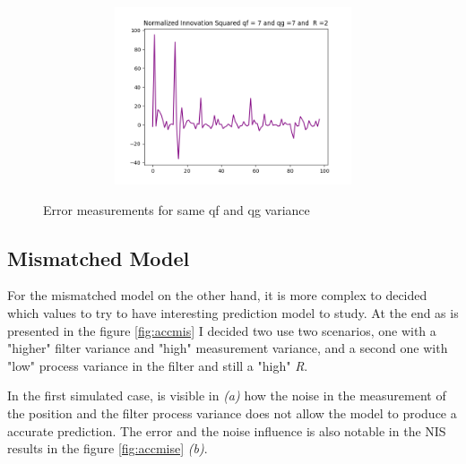 \documentclass{article}
\begin{document}
\begin{figure}[H]
\begin{subfigure}{1\textwidth}
\begin{subfigure}{.5\textwidth}
                    \caption{}
                \end{subfigure}
                \begin{subfigure}{.5\textwidth} 
                    \centering  
                    \includegraphics[width=.6\linewidth]{./img/acc/nis7_qg7_r2.png}
                    \caption{}
                \end{subfigure}                
            \end{subfigure}
            \caption{Error measurements for same qf and qg variance}
            \label{fig:accmate}
        \end{figure}

        \subsection{Mismatched Model}

        For the mismatched model on the other hand, it is more complex to decided which values to try to have interesting
        prediction model to study. At the end as is presented in the figure \ref{fig:accmis} I decided two use two scenarios,
        one with a "higher" filter variance and "high" measurement variance, and  a second one with "low" process variance in the
        filter and still a "high" \textit{R}.

        In the first simulated case, is visible in \textit{(a)} how the noise in the measurement of the position and the filter process
        variance does not allow the model to produce a accurate prediction. The error and the noise influence is also notable in the NIS
        results in the figure \ref{fig:accmise} \textit{(b)}.
\end{document}
